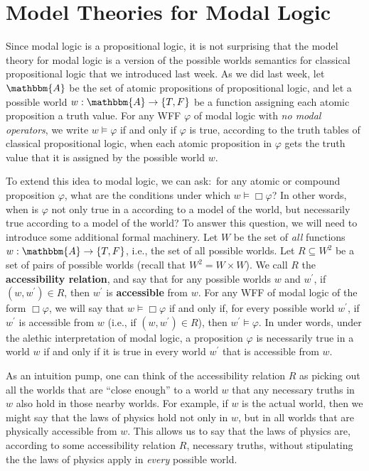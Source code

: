 \documentclass[11pt]{article}
\theoremstyle{definition}
\theoremstyle{remark}
\begin{document}
\section{Model Theories for Modal Logic}
Since modal logic is a propositional logic, it is not surprising that the model theory for modal logic is a version of the possible worlds semantics for classical propositional logic that we introduced last week. As we did last week, let $\mathbbm{A}$ be the set of atomic propositions of propositional logic, and let a possible world $w:\mathbbm{A}\rightarrow\{T,F\}$ be a function assigning each atomic proposition a truth value. For any WFF $\varphi$ of modal logic with \textit{no modal operators}, we write $w\vDash \varphi$ if and only if $\varphi$ is true, according to the truth tables of classical propositional logic, when each atomic proposition in $\varphi$ gets the truth value that it is assigned by the possible world $w$.\par 


To extend this idea to modal logic, we can ask:\ for any atomic or compound proposition $\varphi$, what are the conditions under which $w\vDash \Box\varphi$? In other words, when is $\varphi$ not only true in a according to a model of the world, but necessarily true according to a model of the world? To answer this question, we will need to introduce some additional formal machinery. Let $W$ be the set of \textit{all} functions $w:\mathbbm{A}\rightarrow\{T,F\}$, i.e., the set of all possible worlds. Let $R\subseteq W^{2}$ be a set of pairs of possible worlds (recall that $W^{2}=W\times W$). We call $R$ the \textbf{accessibility relation}, and say that for any possible worlds $w$ and $w^{\prime}$, if $(w,w^{\prime})\in R$, then $w^{\prime}$ is \textbf{accessible} from $w$. For any WFF of modal logic of the form $\Box\varphi$, we will say that $w\vDash\Box\varphi$ if and only if, for every possible world $w^{\prime}$, if $w^{\prime}$ is accessible from $w$ (i.e., if $(w,w^{\prime})\in R$), then $w^{\prime}\vDash \varphi$. In under words, under the alethic interpretation of modal logic, a proposition $\varphi$ is necessarily true in a world $w$ if and only if it is true in every world $w^{\prime}$ that is accessible from $w$.\par


As an intuition pump, one can think of the accessibility relation $R$ as picking out all the worlds that are ``close enough'' to a world $w$ that any necessary truths in $w$ also hold in those nearby worlds. For example, if $w$ is the actual world, then we might say that the laws of physics hold not only in $w$, but in all worlds that are physically accessible from $w$. This allows us to say that the laws of physics are, according to some accessibility relation $R$, necessary truths, without stipulating the the laws of physics apply in \textit{every} possible world.\par
\end{document}
